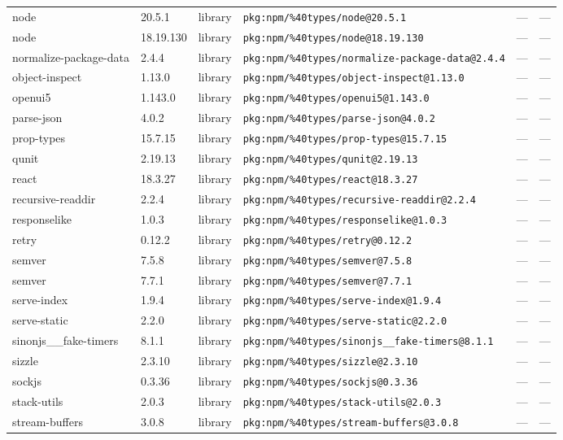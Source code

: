 \documentclass[11pt]{article}
\begin{document}
\begin{longtable}{|l|l|l|p{2.2cm}|l|p{4cm}|}
node & 20.5.1 & library & \texttt{pkg:npm/\%40types/node@20.5.1} & — & — \\
node & 18.19.130 & library & \texttt{pkg:npm/\%40types/node@18.19.130} & — & — \\
normalize-package-data & 2.4.4 & library & \texttt{pkg:npm/\%40types/normalize-package-data@2.4.4} & — & — \\
object-inspect & 1.13.0 & library & \texttt{pkg:npm/\%40types/object-inspect@1.13.0} & — & — \\
openui5 & 1.143.0 & library & \texttt{pkg:npm/\%40types/openui5@1.143.0} & — & — \\
parse-json & 4.0.2 & library & \texttt{pkg:npm/\%40types/parse-json@4.0.2} & — & — \\
prop-types & 15.7.15 & library & \texttt{pkg:npm/\%40types/prop-types@15.7.15} & — & — \\
qunit & 2.19.13 & library & \texttt{pkg:npm/\%40types/qunit@2.19.13} & — & — \\
react & 18.3.27 & library & \texttt{pkg:npm/\%40types/react@18.3.27} & — & — \\
recursive-readdir & 2.2.4 & library & \texttt{pkg:npm/\%40types/recursive-readdir@2.2.4} & — & — \\
responselike & 1.0.3 & library & \texttt{pkg:npm/\%40types/responselike@1.0.3} & — & — \\
retry & 0.12.2 & library & \texttt{pkg:npm/\%40types/retry@0.12.2} & — & — \\
semver & 7.5.8 & library & \texttt{pkg:npm/\%40types/semver@7.5.8} & — & — \\
semver & 7.7.1 & library & \texttt{pkg:npm/\%40types/semver@7.7.1} & — & — \\
serve-index & 1.9.4 & library & \texttt{pkg:npm/\%40types/serve-index@1.9.4} & — & — \\
serve-static & 2.2.0 & library & \texttt{pkg:npm/\%40types/serve-static@2.2.0} & — & — \\
sinonjs\_\_fake-timers & 8.1.1 & library & \texttt{pkg:npm/\%40types/sinonjs\_\_fake-timers@8.1.1} & — & — \\
sizzle & 2.3.10 & library & \texttt{pkg:npm/\%40types/sizzle@2.3.10} & — & — \\
sockjs & 0.3.36 & library & \texttt{pkg:npm/\%40types/sockjs@0.3.36} & — & — \\
stack-utils & 2.0.3 & library & \texttt{pkg:npm/\%40types/stack-utils@2.0.3} & — & — \\
stream-buffers & 3.0.8 & library & \texttt{pkg:npm/\%40types/stream-buffers@3.0.8} & — & — \\

\end{longtable}
\end{document}
